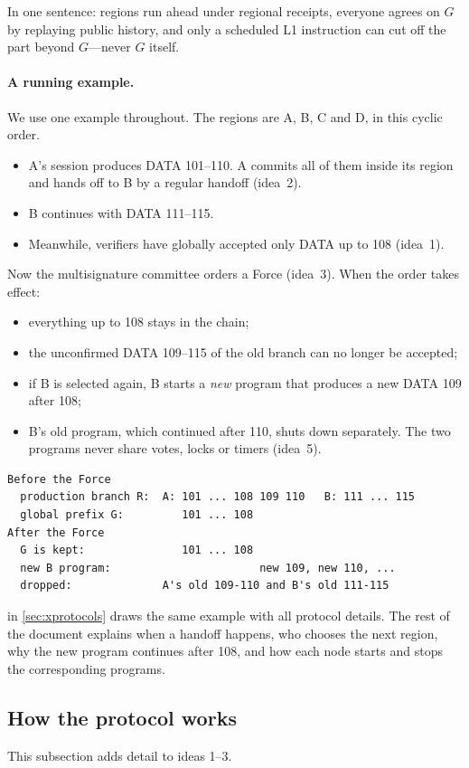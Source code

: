 \documentclass[11pt,a4paper]{article}
\newcounter{protocol}
\begin{document}
In one sentence: regions run ahead under regional receipts, everyone
agrees on $G$ by replaying public history, and only a scheduled L1
instruction can cut off the part beyond $G$---never $G$ itself.

\paragraph{A running example.}
We use one example throughout. The regions are A, B, C and D, in this
cyclic order.
\begin{itemize}
\item A's session produces DATA 101--110. A commits all of them inside
its region and hands off to B by a regular handoff (idea~2).
\item B continues with DATA 111--115.
\item Meanwhile, verifiers have globally accepted only DATA up to 108
(idea~1).
\end{itemize}
Now the multisignature committee orders a Force (idea~3). When the order
takes effect:
\begin{itemize}
\item everything up to 108 stays in the chain;
\item the unconfirmed DATA 109--115 of the old branch can no longer be
accepted;
\item if B is selected again, B starts a \emph{new} program that produces
a new DATA 109 after 108;
\item B's old program, which continued after 110, shuts down separately.
The two programs never share votes, locks or timers (idea~5).
\end{itemize}
\begin{center}\small
\begin{verbatim}
Before the Force
  production branch R:  A: 101 ... 108 109 110   B: 111 ... 115
  global prefix G:         101 ... 108
After the Force
  G is kept:               101 ... 108
  new B program:                       new 109, new 110, ...
  dropped:              A's old 109-110 and B's old 111-115
\end{verbatim}
\end{center}
 in \cref{sec:xprotocols} draws the same
example with all protocol details. The rest of the document explains when
a handoff happens, who chooses the next region, why the new program
continues after 108, and how each node starts and stops the
corresponding programs.

\subsection{How the protocol works}
This subsection adds detail to ideas 1--3.
\end{document}
